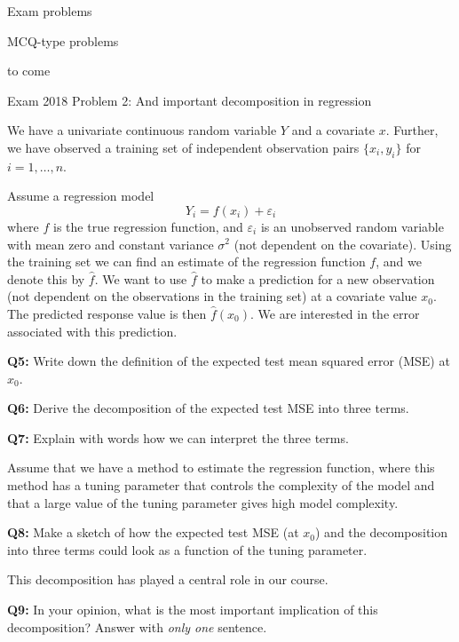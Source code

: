 \documentclass[ignorenonframetext,]{beamer}
\begin{document}
\begin{frame}{Exam problems}

\begin{block}{MCQ-type problems}

to come

\end{block}

\begin{block}{Exam 2018 Problem 2: And important decomposition in
regression}

We have a univariate continuous random variable \(Y\) and a covariate
\(x\). Further, we have observed a training set of independent
observation pairs \(\{x_i, y_i\}\) for \(i=1,\ldots,n\).

Assume a regression model \[Y_i  = f(x_i) + \varepsilon_i\] where \(f\)
is the true regression function, and \(\varepsilon_i\) is an unobserved
random variable with mean zero and constant variance \(\sigma^2\) (not
dependent on the covariate). Using the training set we can find an
estimate of the regression function \(f\), and we denote this by
\(\hat{f}\). We want to use \(\hat{f}\) to make a prediction for a new
observation (not dependent on the observations in the training set) at a
covariate value \(x_0\). The predicted response value is then
\(\hat{f}(x_0)\). We are interested in the error associated with this
prediction.

\textbf{Q5:} Write down the definition of the expected test mean squared
error (MSE) at \(x_0\).

\textbf{Q6:} Derive the decomposition of the expected test MSE into
three terms.

\textbf{Q7:} Explain with words how we can interpret the three terms.

Assume that we have a method to estimate the regression function, where
this method has a tuning parameter that controls the complexity of the
model and that a large value of the tuning parameter gives high model
complexity.

\textbf{Q8:} Make a sketch of how the expected test MSE (at \(x_0\)) and
the decomposition into three terms could look as a function of the
tuning parameter.

This decomposition has played a central role in our course.

\textbf{Q9:} In your opinion, what is the most important implication of
this decomposition? Answer with \emph{only one} sentence.

\end{block}

\end{frame}
\end{document}

